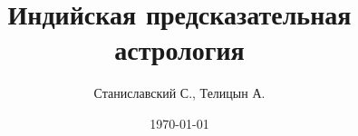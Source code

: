 \documentclass[a4paper,oneside,12pt]{book}
\author{Станиславский С., Телицын А.}
\title{Индийская предсказательная астрология}
\date{\today}
\begin{document}
\pagestyle{empty}


\renewcommand\contentsname{СОДЕРЖАНИЕ}


\clearpage

\begin{spacing}{0.9}
\tableofcontents
{}
\end{spacing}

\clearpage

\pagestyle{fancy}

\setcounter{page}{3}










\newpage
\printbibliography
\end{document}

